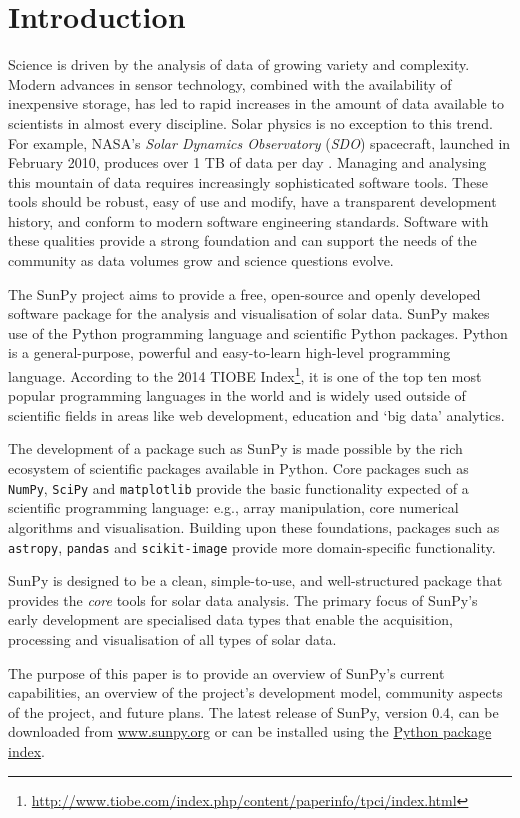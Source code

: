 \section{Introduction}\label{sec:Intro}

Science is driven by the analysis of data of growing variety and complexity.
Modern advances in sensor
technology, combined with the availability of inexpensive storage, has led to
rapid increases in the amount of data available to scientists in almost
every discipline.  Solar physics is no exception to this trend. For example,
NASA's \textit{Solar Dynamics Observatory} (\textit{SDO}) spacecraft, launched in February 2010,
produces over 1 TB of data per day \citep{aia}. Managing and
analysing this mountain of data
requires increasingly sophisticated software tools.
These tools should be robust, easy of use and modify, have a
transparent development history, and conform
to modern software engineering standards.  Software with these qualities provide a strong
foundation and can support the needs of the community as data
volumes grow and science questions evolve.

The SunPy project aims to provide a free, open-source and openly developed software package 
for the analysis and visualisation of solar data. SunPy makes use of the Python 
programming language and scientific Python packages. Python is a general-purpose,
powerful and easy-to-learn high-level programming language.
According to the 2014 TIOBE Index\footnote{\url{http://www.tiobe.com/index.php/content/paperinfo/tpci/index.html}},
 it is one of the top ten most popular programming languages in the world 
and is widely used outside of scientific fields in areas like web development, education 
and `big data' analytics.

The development of a package such as SunPy is made possible by the 
rich ecosystem of scientific packages available in Python. Core packages such 
as \texttt{NumPy}, \texttt{SciPy} and \texttt{matplotlib} 
provide the basic functionality expected of a scientific programming language:
e.g., array manipulation, core numerical algorithms and visualisation. 
Building upon these foundations, packages such as \texttt{astropy}, \texttt{pandas} and 
\texttt{scikit-image} provide more domain-specific functionality.

SunPy is designed to be a clean, simple-to-use, and well-structured 
package that provides the \textit{core} tools for solar data analysis. 
The primary focus of SunPy's early development are 
specialised data types that enable the acquisition, processing and 
visualisation of all types of solar data.

The purpose of this paper is to provide an overview of SunPy's current 
capabilities, an overview of the project's development model, community aspects of the 
project, and future plans. The latest release of SunPy, version 0.4,
can be downloaded from \href{http://sunpy.org}{www.sunpy.org} or can be
installed using the \href{http://pypi.python.org/pypi}{Python package index}.
